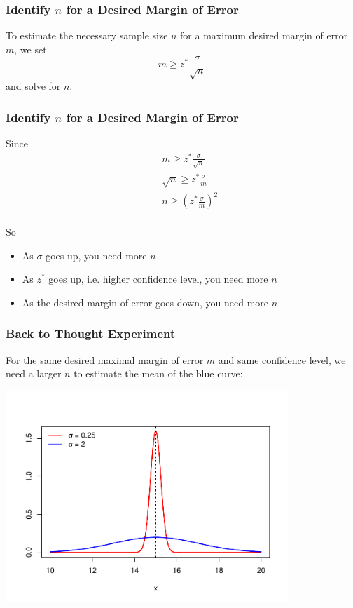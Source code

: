 \documentclass[handout]{beamer}
\begin{document}
\begin{frame}
\frametitle{Identify $n$ for a Desired Margin of Error}
%
%
To estimate the necessary sample size $n$ for a maximum desired margin of error $m$, we set
\[
m \geq z^* \frac{\sigma}{\sqrt{n}}
\]
and solve for $n$.  
\end{frame}


\begin{frame}
\frametitle{Identify $n$ for a Desired Margin of Error}
Since
%
%
\begin{eqnarray*}
&&m \geq z^*\frac{\sigma}{\sqrt{n}}\\
&& \sqrt{n} \geq z^*\frac{\sigma}{m}\\
&& n \geq \left(z^*\frac{\sigma}{m}\right)^2\\
\end{eqnarray*}

\vspace{3cm}

\pause So
\begin{itemize}
\pause\item As $\sigma$ goes up, you need more $n$
\pause\item As $z^*$ goes up, i.e. higher confidence level, you need more $n$
\pause\item As the desired margin of error goes down, you need more $n$
\end{itemize}

\end{frame}


\begin{frame}
\frametitle{Back to Thought Experiment}
For the same desired maximal margin of error $m$ and same confidence level, we need a larger $n$ to estimate the mean of the blue curve:
\begin{center}
\includegraphics[width=0.8\textwidth]{figure/norm.pdf}
\end{center}
\end{frame}
\end{document}
